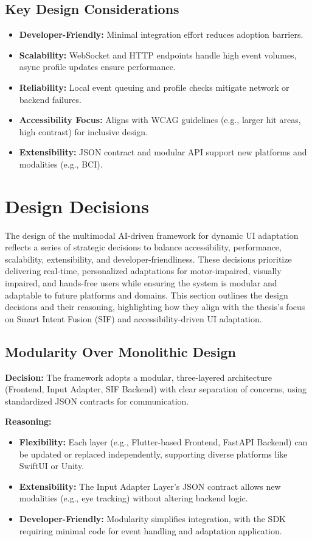 \documentclass[openany]{book}
\begin{document}
\subsection{Key Design Considerations}
\begin{itemize}
    \item \textbf{Developer-Friendly:} Minimal integration effort reduces adoption barriers.
    \item \textbf{Scalability:} WebSocket and HTTP endpoints handle high event volumes, async profile updates ensure performance.
    \item \textbf{Reliability:} Local event queuing and profile checks mitigate network or backend failures.
    \item \textbf{Accessibility Focus:} Aligns with WCAG guidelines (e.g., larger hit areas, high contrast) for inclusive design.
    \item \textbf{Extensibility:} JSON contract and modular API support new platforms and modalities (e.g., BCI).
\end{itemize}

\section{Design Decisions}
The design of the multimodal AI-driven framework for dynamic UI adaptation reflects a series of strategic decisions to balance accessibility, performance, scalability, extensibility, and developer-friendliness. These decisions prioritize delivering real-time, personalized adaptations for motor-impaired, visually impaired, and hands-free users while ensuring the system is modular and adaptable to future platforms and domains. This section outlines the design decisions and their reasoning, highlighting how they align with the thesis’s focus on Smart Intent Fusion (SIF) and accessibility-driven UI adaptation.

\subsection{Modularity Over Monolithic Design}
\textbf{Decision:} The framework adopts a modular, three-layered architecture (Frontend, Input Adapter, SIF Backend) with clear separation of concerns, using standardized JSON contracts for communication.

\textbf{Reasoning:}
\begin{itemize}
    \item \textbf{Flexibility:} Each layer (e.g., Flutter-based Frontend, FastAPI Backend) can be updated or replaced independently, supporting diverse platforms like SwiftUI or Unity.
    \item \textbf{Extensibility:} The Input Adapter Layer’s JSON contract allows new modalities (e.g., eye tracking) without altering backend logic.
    \item \textbf{Developer-Friendly:} Modularity simplifies integration, with the SDK requiring minimal code for event handling and adaptation application.
\end{itemize}
\end{document}
